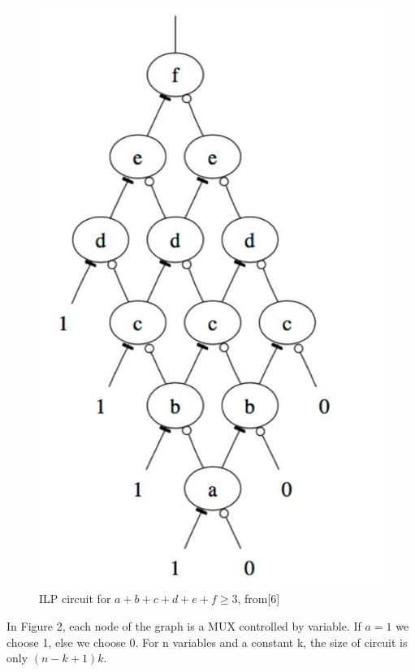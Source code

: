     \begin{figure}[H]
    \centering
    \includegraphics[scale=0.25]{images/ILP}
    \caption{ILP circuit for $a+b+c+d+e+f \geq 3$, from[6]}
    \end{figure}

In Figure 2, each node of the graph is a MUX controlled by variable. If $a=1$ we choose 1, else we choose 0. For n variables and a constant k, the size of circuit is only $(n - k + 1)k$.
